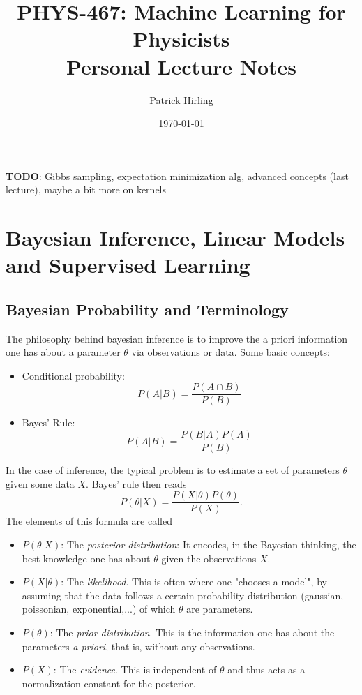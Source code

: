 \documentclass{article}
\title{PHYS-467: Machine Learning for Physicists\\\Large Personal Lecture Notes}
\author{Patrick Hirling}
\date{\today}
\begin{document}
\maketitle
\tableofcontents

\noindent\textbf{TODO}: Gibbs sampling, expectation minimization alg, advanced concepts (last lecture), maybe a bit more on kernels
\section{Bayesian Inference, Linear Models and Supervised Learning}
\subsection{Bayesian Probability and Terminology}
The philosophy behind bayesian inference is to improve the a priori information one has about a parameter $\theta$ via observations or data.
Some basic concepts:
\begin{itemize}
    \item Conditional probability:
        \begin{equation}
            P(A|B) = \frac{P(A \cap B)}{P(B)}
        \end{equation}
    \item Bayes' Rule:
        \begin{equation}
            P(A|B) = \frac{P(B|A) P(A)}{P(B)}
        \end{equation}
\end{itemize}
In the case of inference, the typical problem is to estimate a set of parameters $\theta$ given some data $X$. Bayes' rule then reads
\begin{equation}
    P(\theta|X) = \frac{P(X|\theta) P(\theta)}{P(X)}.
\end{equation}
The elements of this formula are called
\begin{itemize}
    \item $P(\theta|X)$: The \emph{posterior distribution}: It encodes, in the Bayesian thinking, the best knowledge one has about $\theta$ given the observations $X$.
    \item $P(X|\theta)$: The \emph{likelihood}. This is often where one "chooses a model", by assuming that the data follows a certain probability distribution (gaussian, poissonian, exponential,...) of which $\theta$ are parameters.
    \item $P(\theta)$: The \emph{prior distribution}. This is the information one has about the parameters \emph{a priori}, that is, without any observations.
    \item $P(X)$: The \emph{evidence}. This is independent of $\theta$ and thus acts as a normalization constant for the posterior. 
\end{itemize}
\end{document}
